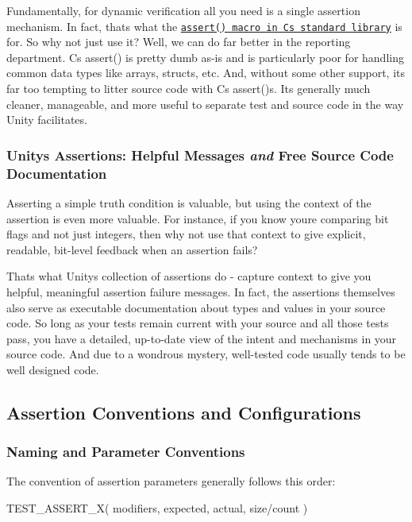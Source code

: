 Fundamentally, for dynamic verification all you need is a single assertion mechanism. In fact, that\textquotesingle{}s what the \href{http://en.wikipedia.org/en/wiki/Assert.h}{\tt assert() macro in C\textquotesingle{}s standard library} is for. So why not just use it? Well, we can do far better in the reporting department. C\textquotesingle{}s {\ttfamily assert()} is pretty dumb as-\/is and is particularly poor for handling common data types like arrays, structs, etc. And, without some other support, it\textquotesingle{}s far too tempting to litter source code with C\textquotesingle{}s {\ttfamily assert()}\textquotesingle{}s. It\textquotesingle{}s generally much cleaner, manageable, and more useful to separate test and source code in the way Unity facilitates.

\subsubsection*{Unity\textquotesingle{}s Assertions\+: Helpful Messages {\itshape and} Free Source Code Documentation}

Asserting a simple truth condition is valuable, but using the context of the assertion is even more valuable. For instance, if you know you\textquotesingle{}re comparing bit flags and not just integers, then why not use that context to give explicit, readable, bit-\/level feedback when an assertion fails?

That\textquotesingle{}s what Unity\textquotesingle{}s collection of assertions do -\/ capture context to give you helpful, meaningful assertion failure messages. In fact, the assertions themselves also serve as executable documentation about types and values in your source code. So long as your tests remain current with your source and all those tests pass, you have a detailed, up-\/to-\/date view of the intent and mechanisms in your source code. And due to a wondrous mystery, well-\/tested code usually tends to be well designed code.

\subsection*{Assertion Conventions and Configurations}

\subsubsection*{Naming and Parameter Conventions}

The convention of assertion parameters generally follows this order\+: \begin{DoxyVerb}TEST_ASSERT_X( {modifiers}, {expected}, actual, {size/count} )
\end{DoxyVerb}


